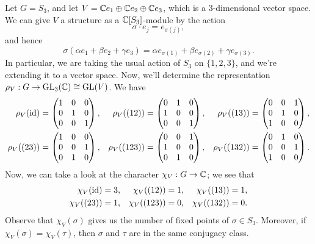 \begin{exmp}{}
    Let $G = S_3$, and let $V = \mathbb{C} e_1 \oplus \mathbb{C} e_2 \oplus \mathbb{C} e_3$, which is a 
    $3$-dimensional vector space. We can give $V$ a structure as a 
    $\mathbb{C}[S_3]$-module by the action 
    \[ \sigma \cdot e_j = e_{\sigma(j)}, \] 
    and hence 
    \[ \sigma(\alpha e_1 + \beta e_2 + \gamma e_3) = \alpha e_{\sigma(1)} 
    + \beta e_{\sigma(2)} + \gamma e_{\sigma(3)}. \] 
    In particular, we are taking the usual action of $S_3$ on $\{1, 2, 3\}$, and 
    we're extending it to a vector space. Now, we'll determine the representation
    $\rho_V : G \to \operatorname{GL}_3(\mathbb{C}) \cong \operatorname{GL}(V)$. We have 
    \begin{align*}
        \rho_V(\operatorname{id}) &= \begin{pmatrix} 1&0&0\\0&1&0\\0&0&1 \end{pmatrix}, & 
        \rho_V((12)) &= \begin{pmatrix} 0&1&0\\1&0&0\\0&0&1 \end{pmatrix}, & 
        \rho_V((13)) &= \begin{pmatrix} 0&0&1\\0&1&0\\1&0&0 \end{pmatrix}, \\ 
        \rho_V((23)) &= \begin{pmatrix} 1&0&0\\0&0&1\\0&1&0 \end{pmatrix}, &
        \rho_V((123)) &= \begin{pmatrix} 0&0&1\\1&0&0\\0&1&0 \end{pmatrix}, &
        \rho_V((132)) &= \begin{pmatrix} 0&1&0\\0&0&1\\1&0&0 \end{pmatrix}.
    \end{align*}
    Now, we can take a look at the character $\chi_V : G \to \mathbb{C}$; we see that 
    \begin{align*}
        \chi_V(\operatorname{id}) &= 3, & \chi_V((12)) &= 1, & \chi_V((13)) &= 1, \\ 
        \chi_V((23)) &= 1, & \chi_V((123)) &= 0, & \chi_V((132)) &= 0. 
    \end{align*}
    Observe that $\chi_V(\sigma)$ gives us the number of fixed points of 
    $\sigma \in S_3$. Moreover, if $\chi_V(\sigma) = \chi_V(\tau)$, then 
    $\sigma$ and $\tau$ are in the same conjugacy class. 
\end{exmp}

